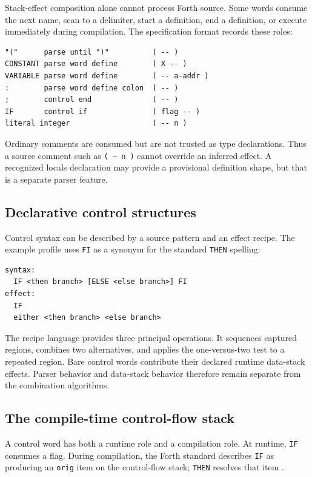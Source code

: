 \documentclass[11pt,a4paper]{article}
\newcommand{\stackeffect}[1]{\mbox{\texttt{#1}}}
\begin{document}
Stack-effect composition alone cannot process Forth source.  Some words consume
the next name, scan to a delimiter, start a definition, end a definition, or
execute immediately during compilation.  The specification format records
these roles:

\begin{lstlisting}
"("      parse until ")"          ( -- )
CONSTANT parse word define        ( X -- )
VARIABLE parse word define        ( -- a-addr )
:        parse word define colon  ( -- )
;        control end              ( -- )
IF       control if               ( flag -- )
literal integer                   ( -- n )
\end{lstlisting}

Ordinary comments are consumed but are not trusted as type declarations.
Thus a source comment such as \stackeffect{( -- n )} cannot override an inferred
effect.  A recognized locals declaration may provide a provisional definition
shape, but that is a separate parser feature.

\subsection{Declarative control structures}

Control syntax can be described by a source pattern and an effect recipe.  The
example profile uses \texttt{FI} as a synonym for the standard \texttt{THEN}
spelling:

\begin{lstlisting}
syntax:
  IF <then branch> [ELSE <else branch>] FI
effect:
  IF
  either <then branch> <else branch>
\end{lstlisting}

The recipe language provides three principal operations.  It sequences captured
regions, combines two alternatives, and applies the one-versus-two test to a
repeated region.  Bare control words contribute their declared runtime
data-stack effects.  Parser behavior and data-stack behavior therefore remain
separate from the combination algorithms.

\subsection{The compile-time control-flow stack}

A control word has both a runtime role and a compilation role.  At runtime,
\texttt{IF} consumes a flag.  During compilation, the Forth standard describes
\texttt{IF} as producing an \texttt{orig} item on the control-flow stack;
\texttt{THEN} resolves that item \cite{forth2012}.
\end{document}
